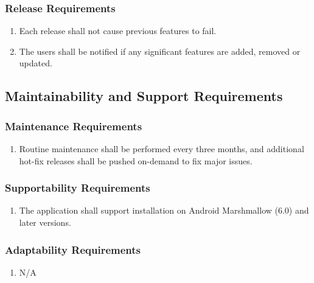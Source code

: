 \documentclass[]{article}
\begin{document}
\subsubsection{Release Requirements}
\label{ssub:release_requirements}
\begin{enumerate}[{OE}1. ]
	\item Each release shall not cause previous features to fail.
	\item The users shall be notified if any significant features are added, removed or updated.
\end{enumerate}


\subsection{Maintainability and Support Requirements}
\label{sub:maintainability_and_support_requirements}

\subsubsection{Maintenance Requirements}
\label{ssub:maintenance_requirements}
\begin{enumerate}[{MS}1. ]
	\item  Routine maintenance shall be performed every three months, and additional hot-fix releases shall be pushed on-demand to fix major issues.

\end{enumerate}

\subsubsection{Supportability Requirements}
\label{ssub:supportability_requirements}
\begin{enumerate}[{MS}1. ]
	\item The application shall support installation on Android Marshmallow (6.0) and later versions.
\end{enumerate}

\subsubsection{Adaptability Requirements}
\label{ssub:adaptability_requirements}
\begin{enumerate}[{MS}1. ]
	\item N/A
\end{enumerate}
\end{document}
